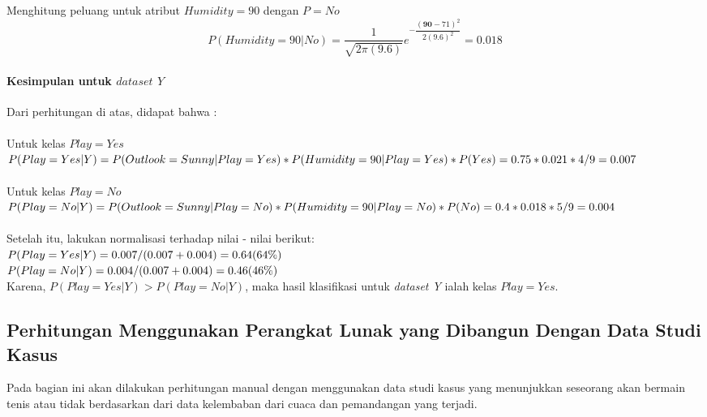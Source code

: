 	Menghitung peluang untuk atribut $Humidity=90$ dengan $P=No$
		\begin{equation}
			P(Humidity=90|No)
			= \dfrac{1}{\sqrt{2\pi(9.6)}}e^{-\dfrac{(\textbf{90}-71)^2}{2(9.6)^2}} 
			= 0.018
		\end{equation}
		
	\paragraph{Kesimpulan untuk $dataset$ $Y$}
	Dari perhitungan di atas, didapat bahwa : \\ \\
	Untuk kelas $Play=Yes$ \\
	$P(Play=Yes|Y) \\
	= P(Outlook=Sunny|Play=Yes)*P(Humidity=90|Play=Yes)*P(Yes) \\
	= 0.75 * 0.021 * 4/9 \\
	= 0.007$ \\ \\
	Untuk kelas $Play=No$ \\
	$P(Play=No|Y) \\
	= P(Outlook=Sunny|Play=No)*P(Humidity=90|Play=No)*P(No) \\
	= 0.4 * 0.018 * 5/9 \\
	= 0.004$ \\ \\
	Setelah itu, lakukan normalisasi terhadap nilai - nilai berikut: \\
	$P(Play=Yes|Y) = 0.007 / (0.007+0.004) \\
	= 0.64 (64\%)$ \\
	$P(Play=No|Y) = 0.004 / (0.007+0.004) \\
	= 0.46 (46\%)$ \\
	
	Karena, $P(Play=Yes|Y) > P(Play=No|Y)$, maka hasil klasifikasi untuk \textit{dataset Y} ialah kelas $Play=Yes$.
	

\subsection{Perhitungan Menggunakan Perangkat Lunak yang Dibangun Dengan Data Studi Kasus}
\label{subsec:Perhitungan Menggunakan Perangkat Lunak yang Dibangun Dengan Data Studi Kasus}

Pada bagian ini akan dilakukan perhitungan manual dengan menggunakan data studi kasus yang menunjukkan seseorang akan bermain tenis atau tidak berdasarkan dari data kelembaban dari cuaca dan pemandangan yang terjadi.


